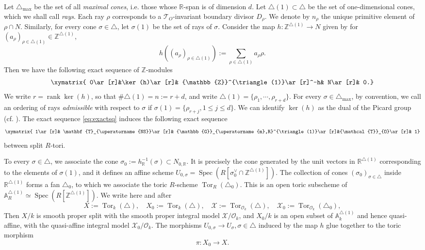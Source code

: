 \documentclass[11pt,letterpaper]{amsart}
\newcommand{\BA}{{\mathbb {A}}}
\newcommand{\BG}{{\mathbb {G}}}
\newcommand{\BR}{{\mathbb {R}}}
\newcommand{\BZ}{{\mathbb {Z}}}
\newcommand{\CO}{{\mathcal {O}}}
\newcommand{\CT}{{\mathcal {T}}}
\newcommand{\CX}{{\mathcal {X}}}
\newcommand{\CTNS}{\mathbf{T}_{\operatorname{NS}}}
\theoremstyle{plain}
\numberwithin{equation}{section}
\theoremstyle{definition}
\theoremstyle{remark}
\begin{document}
Let $\triangle_{\max}$ be the set of all \emph{maximal cones}, i.e. those whose $\BR$-span is of dimension $d$. Let $\triangle(1)\subset \triangle$ be the set of one-dimensional cones, which we shall call \emph{rays}. Each ray $\rho$ corresponds to a $\CT_{O}$-invariant boundary divisor $D_\rho$. We denote by $n_\rho$ the unique primitive element of $\rho\cap N$. Similarly, for every cone $\sigma\in\triangle$, let $\sigma(1)$ be the set of rays of $\sigma$. Consider the map $h:\BZ^{\triangle(1)}\to N$ given by for $(a_\rho)_{\rho\in\triangle(1)}\in \BZ^{\triangle(1)}$, 
$$h((a_\rho)_{\rho\in\triangle(1)}):=\sum_{\rho\in\triangle(1)}a_\rho \rho.$$ Then we have the following exact sequence of $\BZ$-modules  \begin{equation}\label{eq:exactsq}
	\xymatrix{
	0\ar[r]&\ker(h)\ar[r]& \BZ^{\triangle(1)}\ar[r]^-h&
	N\ar[r]& 0.}
\end{equation} We write $r=\operatorname{rank}\ker(h)$, so that $\#\triangle(1)=n:=r+d$, and write $\triangle(1)=\{\rho_1,\cdots,\rho_{r+d}\}$. For every $\sigma\in\triangle_{\max}$, by convention, we call an ordering of rays  \emph{admissible} with respect to $\sigma$ if $\sigma(1)=\{\rho_{r+j},1\leqslant j\leqslant d\}$. 
We can identify $\ker(h)$ as the dual of the Picard group (cf. \cite[Theorem 4.1.3]{Coxbook}). 
The exact sequence \eqref{eq:exactsq} induces the following exact sequence 
\begin{equation}\label{eq:toriexactseq}
	\xymatrix{ 1\ar[r]& \CTNS\ar[r]& \BG_{\operatorname{m},R}^{\triangle(1)}\ar[r]&\CT_{O}\ar[r]& 1}\index{TNS@$\mathcal{T}_{\operatorname{NS}},\widetilde{\mathcal{T}}_{\operatorname{NS}}$}
\end{equation} between split $R$-tori.


To every $\sigma\in\triangle$, we associate the cone $\sigma_0:=h_{\BR}^{-1}(\sigma)\subset N_{0,\BR}$. It is precisely the cone generated by the unit vectors in $\BR^{\triangle(1)}$ corresponding to the elements of $\sigma(1)$, and it defines an affine scheme $U_{0,\sigma}=\operatorname{Spec}(R[\sigma_0^\vee\cap \BZ^{\triangle(1)}])$. The collection of cones $(\sigma_0)_{\sigma\in\triangle}$ inside $\BR^{\triangle(1)}$ forms a fan $\triangle_0$, to which we associate the toric $R$-scheme $\operatorname{Tor}_R(\triangle_0)$. This is an open toric subscheme of $\BA^{\triangle(1)}_R\simeq \operatorname{Spec}(R[\BZ^{\triangle(1)}])$. 
We write here and after $$X:=\operatorname{Tor}_k(\triangle),\quad X_0:=\operatorname{Tor}_k(\triangle),\quad  \CX:=\operatorname{Tor}_{\CO_k}(\triangle),\quad \CX_0:=\operatorname{Tor}_{\CO_k}(\triangle_0),$$
Then $X/k$ is smooth proper split with the smooth proper integral model $\CX/\CO_k$, and $X_0/k$ is an open subset of $\BA^{\triangle(1)}_k$ and hence quasi-affine, with the quasi-affine integral model $\CX_0/\CO_k$.
The morphisms $U_{0,\sigma}\to U_\sigma,\sigma\in\triangle$ induced by the map $h$ glue together to the toric morphism \begin{equation}\label{eq:morptoric}
	\pi:X_0\to X. 
\end{equation}
\end{document}
